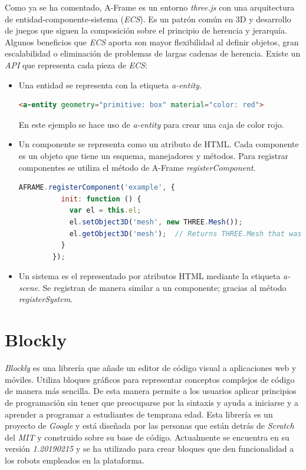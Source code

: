     Como ya se ha comentado, A-Frame es un entorno \textit{three.js} con una arquitectura de entidad-componente-sistema (\textit{ECS}). Es un patrón común en 3D y desarrollo de juegos que siguen la composición sobre el principio de herencia y jerarquía. Algunos beneficios que \textit{ECS} aporta son mayor flexibilidad al definir objetos, gran escalabilidad o eliminación de problemas de largas cadenas de herencia. Existe un \textit{API} que representa cada pieza de \textit{ECS}: 
    \begin{itemize}
    \item Una entidad se representa con la etiqueta \textit{a-entity}. 
        \begin{lstlisting}[language=HTML]
        <a-entity geometry="primitive: box" material="color: red">
        \end{lstlisting}
        En este ejemplo se hace uso de \textit{a-entity} para crear una caja de color rojo. 

    
    \item Un componente se representa como un atributo de HTML. Cada componente es un objeto que tiene un esquema, manejadores y métodos. Para registrar componentes se utiliza el método de A-Frame \textit{registerComponent}.
    
    \begin{lstlisting}[language=javascript, caption=Código para registrar un componente]
        AFRAME.registerComponent('example', {
          init: function () {
            var el = this.el;
            el.setObject3D('mesh', new THREE.Mesh());
            el.getObject3D('mesh');  // Returns THREE.Mesh that was just created.
          }
        });
    \end{lstlisting}
    
    \item Un sistema es el representado por atributos HTML mediante la etiqueta \textit{a-scene}. Se registran de manera similar a un componente; gracias al método \textit{registerSystem}.
\end{itemize}


\section{Blockly}
\label{sec:blockly}
\textit{Blockly} es una librería que añade un editor de código visual a aplicaciones web y móviles. Utiliza bloques gráficos para representar conceptos complejos de código de manera más sencilla. De esta manera permite a los usuarios aplicar  principios de programación sin tener que preocuparse por la sintaxis y ayuda a iniciarse y a aprender a programar a estudiantes de temprana edad. Esta librería es un proyecto de \textit{Google} y está diseñada por las personas que están detrás de \textit{Scratch} del \textit{MIT} y construido sobre su base de código. Actualmente se encuentra en su versión \textit{1.20190215} y se ha utilizado para crear bloques que den funcionalidad a los robots empleados en la plataforma. 

